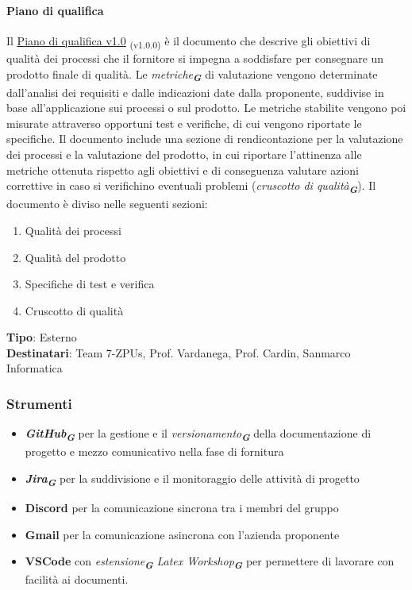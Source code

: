 \documentclass[a4paper,12pt]{article}
\newcommand{\glossario}[1]{\textit{#1}\textsubscript{\textbf{\textit{\textcolor{lightblack}{G}}}}}
\newcommand{\ped}[1]{\textsubscript{#1}}
\begin{document}
\paragraph{Piano di qualifica}\label{pianoDiQualifica}
Il
\href{https://7-zpus.github.io/Docs/assets/2_RTB/DocumentiEsterni/PianoDiQualifica.pdf}{\ul{Piano
        di qualifica v1.0}} \ped{(v1.0.0)} è il
documento che descrive gli obiettivi di qualità dei processi che il fornitore si impegna a
soddisfare per consegnare un prodotto finale di qualità. Le
\glossario{metriche} di valutazione vengono determinate dall'analisi dei
requisiti e dalle indicazioni date dalla proponente, suddivise in base
all'applicazione sui processi o sul prodotto. Le metriche stabilite vengono poi
misurate attraverso opportuni test e verifiche, di cui vengono riportate le
specifiche. Il documento include una sezione di rendicontazione per la
valutazione dei processi e la valutazione del prodotto, in cui riportare
l'attinenza alle metriche ottenuta rispetto agli obiettivi e di conseguenza
valutare azioni correttive in caso si verifichino eventuali problemi
(\glossario{cruscotto di qualità}). Il documento è diviso nelle seguenti
sezioni:
\begin{enumerate}
    \item Qualità dei processi
    \item Qualità del prodotto
    \item Specifiche di test e verifica
    \item Cruscotto di qualità
\end{enumerate}
\textbf{Tipo}: Esterno \\
\textbf{Destinatari}: Team 7-ZPUs, Prof. Vardanega, Prof. Cardin, Sanmarco Informatica \\

\subsubsection{Strumenti}
\begin{itemize}
    \item \glossario{\textbf{GitHub}} per la gestione e il \glossario{versionamento} della documentazione di progetto e mezzo comunicativo nella fase di fornitura
    \item \glossario{\textbf{Jira}} per la suddivisione e il monitoraggio delle attività di progetto
    \item \textbf{Discord} per la comunicazione sincrona tra i membri del gruppo
    \item \textbf{Gmail} per la comunicazione asincrona con l'azienda proponente
    \item \textbf{VSCode} con \glossario{estensione} \glossario{Latex Workshop} per permettere di lavorare con facilità ai documenti.
\end{itemize}
\end{document}
